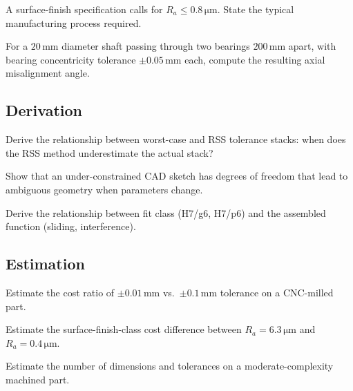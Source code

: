 \begin{exercise}
A surface-finish specification calls for $R_a \leq 0.8\,\si{\micro\meter}$. State the typical manufacturing process required.
\end{exercise}

\begin{exercise}
For a $20\,\si{\milli\meter}$ diameter shaft passing through two bearings $200\,\si{\milli\meter}$ apart, with bearing concentricity tolerance $\pm 0.05\,\si{\milli\meter}$ each, compute the resulting axial misalignment angle.
\end{exercise}

\subsection*{Derivation}

\begin{exercise}
Derive the relationship between worst-case and RSS tolerance stacks: when does the RSS method underestimate the actual stack?
\end{exercise}

\begin{exercise}
Show that an under-constrained CAD sketch has degrees of freedom that lead to ambiguous geometry when parameters change.
\end{exercise}

\begin{exercise}
Derive the relationship between fit class (H7/g6, H7/p6) and the assembled function (sliding, interference).
\end{exercise}

\subsection*{Estimation}

\begin{exercise}
Estimate the cost ratio of $\pm 0.01\,\si{\milli\meter}$ vs.\ $\pm 0.1\,\si{\milli\meter}$ tolerance on a CNC-milled part.
\end{exercise}

\begin{exercise}
Estimate the surface-finish-class cost difference between $R_a = 6.3\,\si{\micro\meter}$ and $R_a = 0.4\,\si{\micro\meter}$.
\end{exercise}

\begin{exercise}
Estimate the number of dimensions and tolerances on a moderate-complexity machined part.
\end{exercise}


